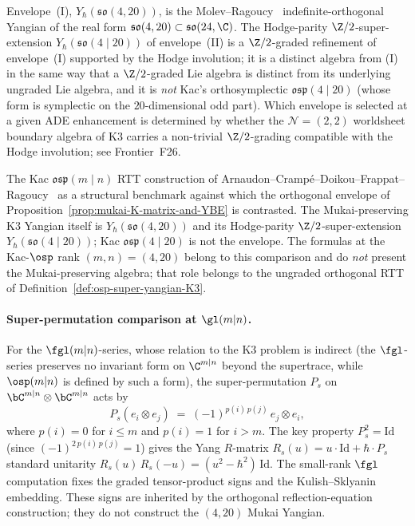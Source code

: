 \begin{remark}
\label{rem:so-4-20-alternative}
Envelope~(I), $Y_\hbar(\mathfrak{so}(4, 20))$, is the
Molev--Ragoucy~\cite{MolevRagoucy2008} indefinite-orthogonal Yangian
of the real form $\mathfrak{so}(4, 20) \subset \mathfrak{so}(24, \C)$.
The Hodge-parity $\Z/2$-super-extension
$Y_\hbar(\mathfrak{so}(4 \mid 20))$ of envelope~(II) is a
$\Z/2$-graded refinement of envelope~(I) supported by the Hodge
involution; it is a distinct algebra from (I) in the same way that
a $\Z/2$-graded Lie algebra is distinct from its underlying ungraded
Lie algebra, and it is \emph{not} Kac's orthosymplectic
$\mathfrak{osp}(4 \mid 20)$ (whose form is symplectic on the
$20$-dimensional odd part). Which envelope is selected at a given
ADE enhancement is determined by whether the $\mathcal{N} = (2, 2)$
worldsheet boundary algebra of K$3$ carries a non-trivial
$\Z/2$-grading compatible with the Hodge involution; see
Frontier~F26.
\end{remark}

\begin{remark}
\label{rem:k3-kac-osp-warmup-scope}
The Kac $\mathfrak{osp}(m \mid n)$
RTT construction of Arnaudon--Cramp\'e--Doikou--Frappat--Ragoucy~\cite{AcdfR2003}
as a structural benchmark against which the orthogonal envelope of
Proposition~\ref{prop:mukai-K-matrix-and-YBE} is contrasted. The
Mukai-preserving K$3$ Yangian itself is
$Y_\hbar(\mathfrak{so}(4, 20))$ and its Hodge-parity $\Z/2$-super-extension
$Y_\hbar(\mathfrak{so}(4 \mid 20))$; Kac $\mathfrak{osp}(4 \mid 20)$
is not the envelope. The formulas at the Kac-$\osp$ rank
$(m, n) = (4, 20)$ belong to this comparison and
do \emph{not} present the Mukai-preserving algebra; that role
belongs to the ungraded orthogonal RTT of
Definition~\ref{def:osp-super-yangian-K3}.
\end{remark}

\paragraph{Super-permutation comparison at \texorpdfstring{$\gl(m|n)$}{gl(m|n)}.}
For the $\fgl(m|n)$-series, whose relation to the K3 problem is
indirect (the $\fgl$-series preserves no invariant form on
$\C^{m|n}$ beyond the supertrace, while $\osp(m|n)$ is defined
by such a form), the super-permutation $P_s$ on $\bC^{m|n}
\otimes \bC^{m|n}$ acts by
\[
 P_s(e_i \otimes e_j) \;=\; (-1)^{p(i)\, p(j)}\, e_j \otimes e_i,
\]
where $p(i) = 0$ for $i \leq m$ and $p(i) = 1$ for $i > m$. The
key property $P_s^2 = \mathrm{Id}$ (since $(-1)^{2\,p(i)\,p(j)}
= 1$) gives the Yang $R$-matrix
$R_s(u) = u \cdot \mathrm{Id} + \hbar \cdot P_s$
standard unitarity
$R_s(u)\, R_s(-u) = (u^2 - \hbar^2)\, \mathrm{Id}$.
The small-rank $\fgl$ computation fixes the graded tensor-product signs
and the Kulish--Sklyanin embedding.  These signs are inherited by the
orthogonal reflection-equation construction; they do not construct the
$(4,20)$ Mukai Yangian.

